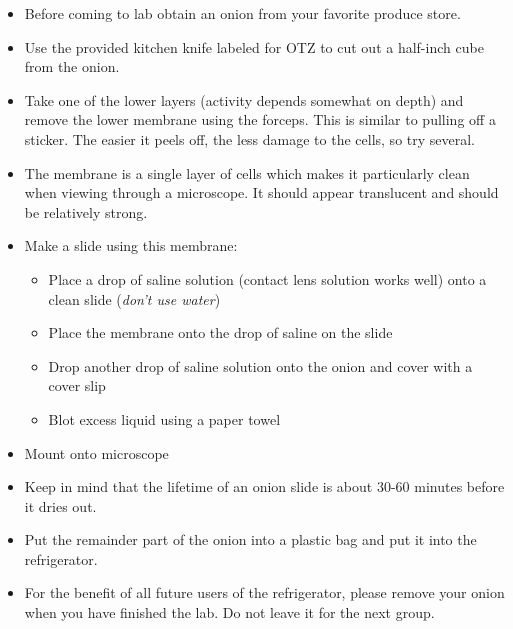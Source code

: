 \documentclass{../lab}
\begin{document}
\begin{itemize}
    \item Before coming to lab obtain an onion from your favorite produce store.

    \item Use the provided kitchen knife labeled for OTZ to cut out a half-inch cube from the onion.

    \item Take one of the lower layers (activity depends somewhat on depth) and remove the lower membrane using the forceps. This is similar to pulling off a sticker. The easier it peels off, the less damage to the cells, so try several.

    \item The membrane is a single layer of cells which makes it particularly clean when viewing through a microscope. It should appear translucent and should be relatively strong.

    \item Make a slide using this membrane:

    \begin{itemize}
        \item Place a drop of saline solution (contact lens solution works well) onto a clean slide (\emph{don't use water})

        \item Place the membrane onto the drop of saline on the slide

        \item Drop another drop of saline solution onto the onion and cover with a cover slip

        \item Blot excess liquid using a paper towel

    \end{itemize}
    
\newpage

    \item Mount onto microscope

    \item Keep in mind that the lifetime of an onion slide is about 30-60 minutes before it dries out.

    \item Put the remainder part of the onion into a plastic bag and put it into the refrigerator.

    \item For the benefit of all future users of the refrigerator, please remove your onion when you have finished the lab. Do not leave it for the next group.

\end{itemize}
\end{document}
